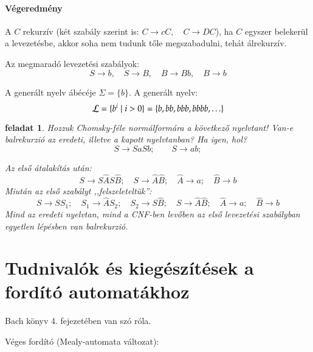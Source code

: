 \documentclass[a4paper]{article}
\newtheorem{feladat}{feladat}[section]
\begin{document}
\paragraph{Végeredmény}
A $C$ rekurzív (két szabály szerint is: $C\to cC,\quad  C\to DC$), ha
$C$ egyszer belekerül a levezetésbe, akkor soha nem tudunk tőle
megszabadulni, tehát álrekurzív.

Az megmaradó levezetési szabályok:
\[ S\to b,\quad  S\to B,\quad  B\to Bb,\quad  B\to b\]

A generált nyelv ábécéje $\Sigma=\{b\}$. A generált nyelv:
\[{\cal L} = \{b^i \mid i>0\}=\{b, bb, bbb, bbbb, \ldots\}\]

\begin{feladat}{}
  Hozzuk Chomsky-féle normálformára a következő nyelvtant!
  Van-e balrekurzió az eredeti, illetve a kapott nyelvtanban?
  Ha igen, hol?
\[
S\rightarrow SaSb;\qquad
S\rightarrow ab;
\]

\begin{megoldas}
  Az első átalakítás után:
\[
S\rightarrow S\hat AS\hat B;\quad
S\rightarrow \hat A\hat B;\quad
\hat A\rightarrow a ;\quad
\hat B\rightarrow b
\]
  Miután az első szabályt ,,felszeleteltük'':
\[
S\rightarrow SS_1;\quad
S_1\rightarrow \hat AS_2;\quad
S_2\rightarrow S\hat B;\quad
S\rightarrow \hat A\hat B;\quad
\hat A\rightarrow a ;\quad
\hat B\rightarrow b
\]
Mind az eredeti nyelvtan, mind a CNF-ben levőben az első levezetési
szabályban egyetlen lépésben van balrekurzió.
\end{megoldas}
\end{feladat}

\section{Tudnivalók és kiegészítések a fordító automatákhoz}

Bach könyv 4. fejezetében van szó róla.

Véges fordító (Mealy-automata változat):\\
\end{document}
